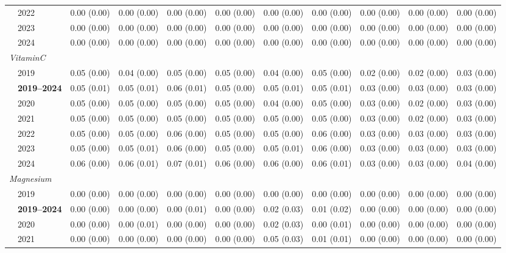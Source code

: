 \begin{table}[htbp]
\begin{tabular}{llrrrrrrrrr}
 & 2022 & 0.00 (0.00) & 0.00 (0.00) & 0.00 (0.00) & 0.00 (0.00) & 0.00 (0.00) & 0.00 (0.00) & 0.00 (0.00) & 0.00 (0.00) & 0.00 (0.00) \\
 & 2023 & 0.00 (0.00) & 0.00 (0.00) & 0.00 (0.00) & 0.00 (0.00) & 0.00 (0.00) & 0.00 (0.00) & 0.00 (0.00) & 0.00 (0.00) & 0.00 (0.00) \\
 & 2024 & 0.00 (0.00) & 0.00 (0.00) & 0.00 (0.00) & 0.00 (0.00) & 0.00 (0.00) & 0.00 (0.00) & 0.00 (0.00) & 0.00 (0.00) & 0.00 (0.00) \\
\midrule
\multicolumn{11}{l}{\textit{VitaminC}} \\
 & 2019 & 0.05 (0.00) & 0.04 (0.00) & 0.05 (0.00) & 0.05 (0.00) & 0.04 (0.00) & 0.05 (0.00) & 0.02 (0.00) & 0.02 (0.00) & 0.03 (0.00) \\
 & \textbf{2019–2024} & 0.05 (0.01) & 0.05 (0.01) & 0.06 (0.01) & 0.05 (0.00) & 0.05 (0.01) & 0.05 (0.01) & 0.03 (0.00) & 0.03 (0.00) & 0.03 (0.00) \\
 & 2020 & 0.05 (0.00) & 0.05 (0.00) & 0.05 (0.00) & 0.05 (0.00) & 0.04 (0.00) & 0.05 (0.00) & 0.03 (0.00) & 0.02 (0.00) & 0.03 (0.00) \\
 & 2021 & 0.05 (0.00) & 0.05 (0.00) & 0.05 (0.00) & 0.05 (0.00) & 0.05 (0.00) & 0.05 (0.00) & 0.03 (0.00) & 0.02 (0.00) & 0.03 (0.00) \\
 & 2022 & 0.05 (0.00) & 0.05 (0.00) & 0.06 (0.00) & 0.05 (0.00) & 0.05 (0.00) & 0.06 (0.00) & 0.03 (0.00) & 0.03 (0.00) & 0.03 (0.00) \\
 & 2023 & 0.05 (0.00) & 0.05 (0.01) & 0.06 (0.00) & 0.05 (0.00) & 0.05 (0.01) & 0.06 (0.00) & 0.03 (0.00) & 0.03 (0.00) & 0.03 (0.00) \\
 & 2024 & 0.06 (0.00) & 0.06 (0.01) & 0.07 (0.01) & 0.06 (0.00) & 0.06 (0.00) & 0.06 (0.01) & 0.03 (0.00) & 0.03 (0.00) & 0.04 (0.00) \\
\midrule
\multicolumn{11}{l}{\textit{Magnesium}} \\
 & 2019 & 0.00 (0.00) & 0.00 (0.00) & 0.00 (0.00) & 0.00 (0.00) & 0.00 (0.00) & 0.00 (0.00) & 0.00 (0.00) & 0.00 (0.00) & 0.00 (0.00) \\
 & \textbf{2019–2024} & 0.00 (0.00) & 0.00 (0.00) & 0.00 (0.01) & 0.00 (0.00) & 0.02 (0.03) & 0.01 (0.02) & 0.00 (0.00) & 0.00 (0.00) & 0.00 (0.00) \\
 & 2020 & 0.00 (0.00) & 0.00 (0.01) & 0.00 (0.00) & 0.00 (0.00) & 0.02 (0.03) & 0.00 (0.01) & 0.00 (0.00) & 0.00 (0.00) & 0.00 (0.00) \\
 & 2021 & 0.00 (0.00) & 0.00 (0.00) & 0.00 (0.00) & 0.00 (0.00) & 0.05 (0.03) & 0.01 (0.01) & 0.00 (0.00) & 0.00 (0.00) & 0.00 (0.00) \\

\end{tabular}
\end{table}
